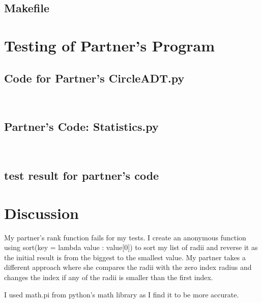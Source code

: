 \documentclass[12pt]{article}
\begin{document}
\noindent 

\newpage

\subsection{Makefile} \label{MakefileSect}

\lstset{language=make}
\noindent 

\newpage

\section{Testing of Partner's Program} \label{PartnerCodeSect}

\subsection{Code for Partner's CircleADT.py} \label{PartnerCircleSect}

\lstset{language=Python}

\noindent 
~\newline

\newpage

\subsection{Partner's Code: Statistics.py} \label{PartnerStatisticsSect}

\lstset{language=Python}

\noindent 
~\newline

\newpage

\subsection{test result for partner's code} \label{PartnerResultSect}

\noindent 

\newpage

\section{Discussion} \label{Discussion}

My partner's rank function fails for my tests. I create an anonymous function using sort(key = lambda value : value[0]) to sort my list of radii and reverse it as the initial result is from the biggest to the smallest value. My partner takes a different approach where she compares the radii with the zero index radius and changes the index if any of the radii is smaller than the first index. 

I used math.pi from python's math library as I find it to be more accurate.
\end{document}
